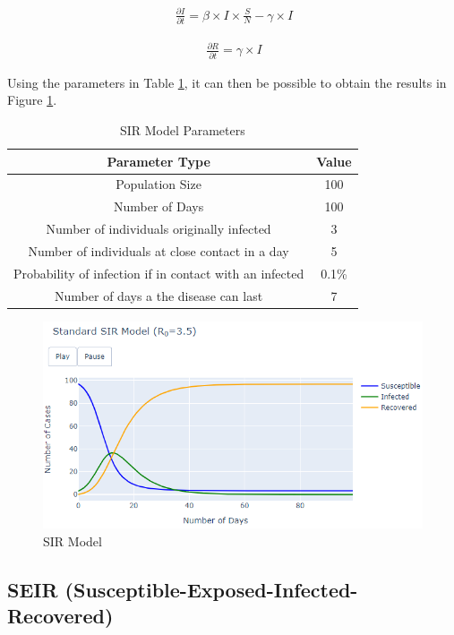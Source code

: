 \useshortskip
\begin{align}
\ \frac{\partial I}{\partial t} = \beta \times I \times \frac{S}{N} -\gamma \times I
\end{align}
\useshortskip

\useshortskip
\begin{align}
\ \frac{\partial R}{\partial t} = \gamma \times I
\end{align}
\useshortskip

Using the parameters in Table \ref{table:1}, it can then be possible to obtain the results in Figure \ref{sir}.

{
\begin{table}[h!]
\centering
\begin{tabular}{|c|c|}
\hline
Parameter Type & Value \\
\hline
Population Size & 100  \\
Number of Days & 100  \\
Number of individuals originally infected & 3  \\
Number of individuals at close contact in a day & 5 \\
Probability of infection if in contact with an infected & 0.1\% \\
Number of days a the disease can last & 7 \\
\hline
\end{tabular}
\caption{SIR Model Parameters}
\label{table:1}
\end{table}
}


\begin{figure}[ht!]%
    \centering
    \includegraphics[width=13cm]{latex/images/sir.PNG}%
    \caption{SIR Model}
    \label{sir}
\end{figure}

\subsection{SEIR (Susceptible-Exposed-Infected-Recovered)}

